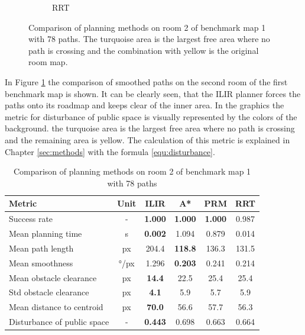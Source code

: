 \begin{figure}[h]
\begin{subfigure}{.25\textwidth}
      \caption{RRT}
    \end{subfigure}
    \caption[Comparison of planning methods on room 2 of benchmark map 1 with 78 paths]{Comparison of planning methods on room 2 of benchmark map 1 with 78 paths. The turquoise area is the largest free area where no path is crossing and the combination with yellow is the original room map.}
    \label{fig:ryu_room2_comparison}
\end{figure}

In Figure \ref{fig:ryu_room2_comparison} the comparison of smoothed paths on the second room of the first benchmark map is shown. It can be clearly seen, that the ILIR planner forces the paths onto its roadmap and keeps clear of the inner area. In the graphics the metric for disturbance of public space is visually represented by the colors of the background. the turquoise area is the largest free area where no path is crossing and the remaining area is yellow. The calculation of this metric is explained in Chapter \ref{sec:methods} with the formula \ref{equ:disturbance}.

\begin{table}[ht]
\centering
\begin{tabular}{lc|cccc}
\hline
\textbf{Metric} & \textbf{Unit} & \textbf{ILIR} & \textbf{A*} & \textbf{PRM} & \textbf{RRT} \\
\hline
Success rate & -                & \textbf{1.000}          & \textbf{1.000}          & \textbf{1.000}      & 0.987 \\
Mean planning time & s          & \textbf{0.002} & 1.094         & 0.879     & 0.014 \\
Mean path length & px           & 204.4          & \textbf{118.8} & 136.3    & 131.5 \\
Mean smoothness & °/px          & 1.296         & \textbf{0.203} & 0.241    & 0.214 \\
Mean obstacle clearance & px    & \textbf{14.4} & 22.5          & 25.4      & 25.4 \\
Std obstacle clearance & px     & \textbf{4.1}  & 5.9           & 5.7       & 5.9 \\
Mean distance to centroid & px  & \textbf{70.0}          & 56.6          & 57.7      & 56.3 \\
Disturbance of public space & - & \textbf{0.443} & 0.698          & 0.663      & 0.664 \\
\hline
\end{tabular}
\caption{Comparison of planning methods on room 2 of benchmark map 1 with 78 paths}
\label{tab:room2_results}
\end{table}

